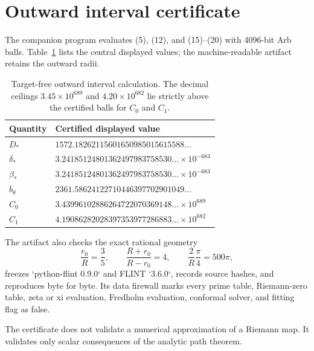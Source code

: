 \section{Outward interval certificate}

The companion program evaluates (5), (12), and (15)--(20) with 4096-bit Arb
balls.  Table~\ref{tab:constants} lists the central displayed values; the
machine-readable artifact retains the outward radii.

\begin{table}[h]
\centering
\small
\begin{tabular}{@{}ll@{}}
\toprule
Quantity & Certified displayed value \\
\midrule
\(D_*\) & \(1572.18262115601650985015615588\ldots\) \\
\(\delta_*\) & \(3.24185124801362497983758530\ldots\times10^{-683}\) \\
\(\beta_*\) & \(3.24185124801362497983758530\ldots\times10^{-683}\) \\
\(b_\theta\) & \(2361.58624122710446397702901049\ldots\) \\
\(C_0\) & \(3.43996102886264722070369148\ldots\times10^{689}\) \\
\(C_1\) & \(4.19086282028397353977286883\ldots\times10^{682}\) \\
\bottomrule
\end{tabular}
\caption{Target-free outward interval calculation.  The decimal ceilings
\(3.45\times10^{689}\) and \(4.20\times10^{682}\) lie strictly above the
certified balls for \(C_0\) and \(C_1\).}
\label{tab:constants}
\end{table}

The artifact also checks the exact rational geometry
\[
 \frac{r_0}{R}=\frac35,
 \qquad
 \frac{R+r_0}{R-r_0}=4,
 \qquad
 \frac2R\frac{\pi}{4}=500\pi,
\]
freezes `python-flint 0.9.0` and FLINT `3.6.0`, records source hashes, and
reproduces byte for byte.  Its data firewall marks every prime table,
Riemann-zero table, zeta or xi evaluation, Fredholm evaluation, conformal
solver, and fitting flag as false.

The certificate does not validate a numerical approximation of a Riemann
map.  It validates only scalar consequences of the analytic path theorem.

